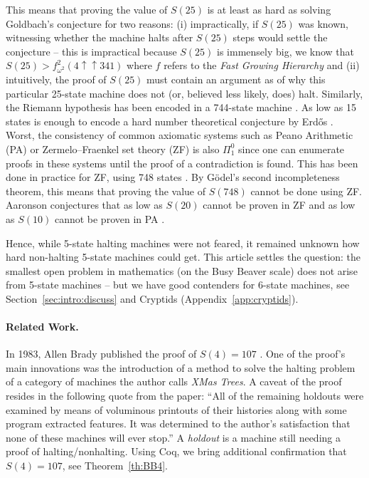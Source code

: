 \documentclass[a4paper,british]{article}
\theoremstyle{definition} %
\numberwithin{equation}{section}
\theoremstyle{definition} %
\newcommand{\BBtheFourth}{107}
\begin{document}
This means that proving the value of $S(25)$ is at least as hard as solving Goldbach's conjecture for two reasons: (i) impractically, if $S(25)$ was known, witnessing whether the machine halts after $S(25)$ steps would settle the conjecture -- this is impractical because $S(25)$ is immensely big, we know that $S(25) > f^2_{\omega^2}(4 \uparrow \uparrow 341)$ where $f$ refers to the \textit{Fast Growing Hierarchy} \cite{wikiChampions,wikipediaFGH} and (ii) intuitively, the proof of $S(25)$ must contain an argument as of why this particular 25-state machine does not (or, believed less likely, does) halt. Similarly, the Riemann hypothesis has been encoded in a 744-state machine \cite{RiemannTM,Yedidia2016,BusyBeaverFrontier}. As low as 15 states is enough to encode a hard number theoretical conjecture by Erd\H{o}s \cite{BB15}. Worst, the consistency of common axiomatic systems such as Peano Arithmetic (PA) or Zermelo–Fraenkel set theory (ZF) is also $\Pi_1^0$ since one can enumerate proofs in these systems until the proof of a contradiction is found. This has been done in practice for ZF, using 748 states \cite{ZFTM,Yedidia2016,BusyBeaverFrontier,BB748Thesis}. By G\"odel's second incompleteness theorem, this means that proving the value of $S(748)$ cannot be done using ZF. Aaronson conjectures that as low as $S(20)$ cannot be proven in ZF and as low as $S(10)$ cannot be proven in PA \cite{BusyBeaverFrontier}.

Hence, while 5-state halting machines were not feared, it remained unknown how hard non-halting 5-state machines could get. This article settles the question: the smallest open problem in mathematics (on the Busy Beaver scale) does not arise from 5-state machines -- but we have good contenders for 6-state machines, see Section~\ref{sec:intro:discuss} and Cryptids (Appendix~\ref{app:cryptids}).

\paragraph{Related Work.} In 1983, Allen Brady published the proof of $S(4) = \BBtheFourth$ \cite{Brady83}. One of the proof's main innovations was the introduction of a method to solve the halting problem of a category of machines the author calls \textit{XMas Trees}. A caveat of the proof resides in the following quote from the paper: ``All of the remaining holdouts were examined by means of voluminous printouts of their histories along with some program extracted features. It was determined to the author's satisfaction that none of these machines will ever stop.'' A \textit{holdout} is a machine still needing a proof of halting/nonhalting. Using Coq, we bring additional confirmation that $S(4) = \BBtheFourth$, see Theorem~\ref{th:BB4}.
\end{document}
